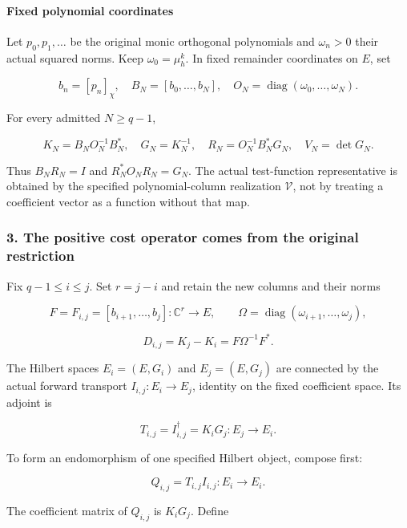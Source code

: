 \paragraph{Fixed polynomial coordinates}\label{endpoint-relation_moment_original--fixed-polynomial-coordinates}

Let \(p_0,p_1,\ldots\) be the original monic orthogonal polynomials and \(\omega_n>0\) their actual squared norms. Keep \(\omega_0=\mu_h^k\). In fixed remainder coordinates on \(E\), set

\[
 b_n=[p_n]_\chi,\quad B_N=[b_0,\ldots,b_N],\quad
 O_N=\operatorname{diag}(\omega_0,\ldots,\omega_N).
\]

For every admitted \(N\ge q-1\),

\[
 K_N=B_NO_N^{-1}B_N^*,\quad G_N=K_N^{-1},\quad
 R_N=O_N^{-1}B_N^*G_N,\quad V_N=\det G_N.                         \tag{5}
\]

Thus \(B_NR_N=I\) and \(R_N^*O_NR_N=G_N\). The actual test-function representative is obtained by the specified polynomial-column realization \(\mathcal V\), not by treating a coefficient vector as a function without that map.

\subsubsection{3. The positive cost operator comes from the original restriction}\label{endpoint-relation_moment_original--the-positive-cost-operator-comes-from-the-original-restriction}

Fix \(q-1\le i\le j\). Set \(r=j-i\) and retain the new columns and their norms

\[
 F=F_{i,j}=[b_{i+1},\ldots,b_j]:\mathbb C^r\to E,\qquad
 \Omega=\operatorname{diag}(\omega_{i+1},\ldots,\omega_j),
\]

\[
 D_{i,j}=K_j-K_i=F\Omega^{-1}F^*.                                \tag{6}
\]

The Hilbert spaces \(E_i=(E,G_i)\) and \(E_j=(E,G_j)\) are connected by the actual forward transport \(I_{i,j}:E_i\to E_j\), identity on the fixed coefficient space. Its adjoint is

\[
 T_{i,j}=I_{i,j}^{\dagger}=K_iG_j:E_j\to E_i.
\]

To form an endomorphism of one specified Hilbert object, compose first:

\[
 Q_{i,j}=T_{i,j}I_{i,j}:E_i\to E_i.
\]

The coefficient matrix of \(Q_{i,j}\) is \(K_iG_j\). Define

